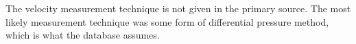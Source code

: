The velocity measurement technique is not given in the primary source.
The most likely measurement technique was some form of differential pressure
method, which is what the database assumes.
